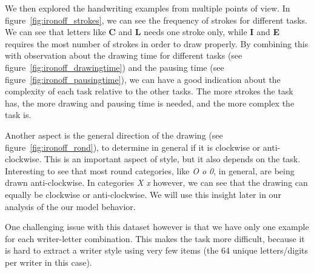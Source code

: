 \par We then explored the handwriting examples from multiple points of view. In figure~\ref{fig:ironoff_strokes}, we can see the frequency of strokes for different tasks. We can see that letters like \textbf{C} and \textbf{L} needs one stroke only, while \textbf{I} and \textbf{E} requires the most number of strokes in order to draw properly. By combining this with observation about the drawing time for different tasks (see figure~\ref{fig:ironoff_drawingtime}) and the pausing time (see figure~\ref{fig:ironoff_pausingtime}), we can have a good indication about the complexity of each task relative to the other tasks. The more strokes the task has, the more drawing and pausing time is needed, and the more complex the task is.

\par Another aspect is the general direction of the drawing (see figure~\ref{fig:ironoff_rond}), to determine in general if it is clockwise or anti-clockwise. This is an important aspect of style, but it also depends on the task. Interesting to see that most round categories, like \textit{O o 0}, in general, are being drawn anti-clockwise. In categories \textit{X x} however, we can see that the drawing can equally be clockwise or anti-clockwise. We will use this insight later in our analysis of the our model behavior.

\par One challenging issue with this dataset however is that we have only one example for each writer-letter combination. This makes the task more difficult, because it is hard to extract a writer style using very few items (the 64 unique letters/digits per writer in this case).

